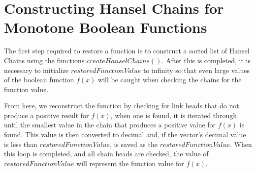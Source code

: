\documentclass{article}
\renewcommand{\_}{\ifincsname_\else\legacyunderscore\fi}
\begin{document}
\section*{Constructing Hansel Chains for Monotone Boolean Functions}

The first step required to restore a function is to construct a sorted list of Hansel Chains using the functions $createHanselChains()$. After this is completed, it is necessary to initialize $restoredFunctionValue$ to infinity so that even large values of the boolean function $f(x)$ will be caught when checking the chains for the function value.

From here, we reconstruct the function by checking for link heads that do not produce a positive result for $f(x)$, when one is found, it is iterated through until the smallest value in the chain that produces a positive value for $f(x)$ is found. This value is then converted to decimal and, if the vector's decimal value is less than $restoredFunctionValue$, is saved as the $restoredFunctionValue$. When this loop is completed, and all chain heads are checked, the value of $restoredFunctionValue$ will represent the function value for $f(x)$.
\end{document}
